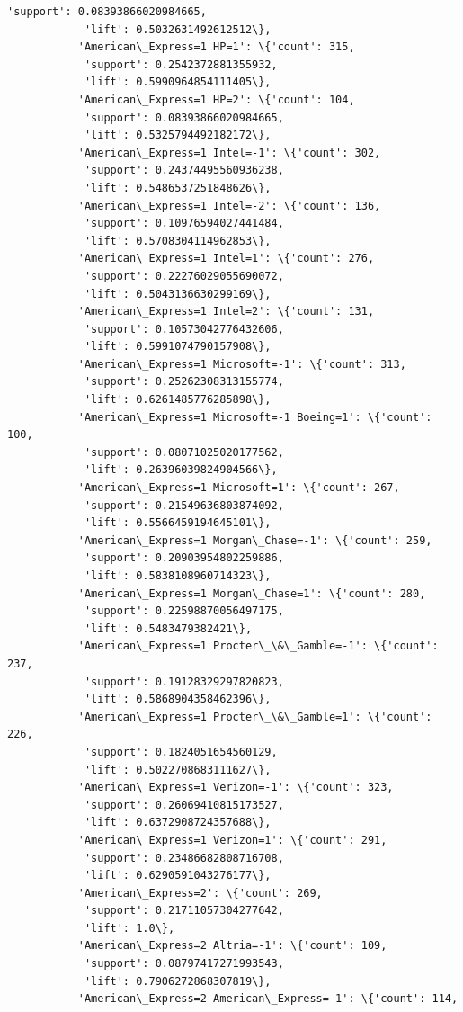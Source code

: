 \documentclass[11pt]{article}
\begin{document}
\begin{Verbatim}[commandchars=\\\{\}]
            'support': 0.08393866020984665,
            'lift': 0.5032631492612512\},
           'American\_Express=1 HP=1': \{'count': 315,
            'support': 0.2542372881355932,
            'lift': 0.5990964854111405\},
           'American\_Express=1 HP=2': \{'count': 104,
            'support': 0.08393866020984665,
            'lift': 0.5325794492182172\},
           'American\_Express=1 Intel=-1': \{'count': 302,
            'support': 0.24374495560936238,
            'lift': 0.5486537251848626\},
           'American\_Express=1 Intel=-2': \{'count': 136,
            'support': 0.10976594027441484,
            'lift': 0.5708304114962853\},
           'American\_Express=1 Intel=1': \{'count': 276,
            'support': 0.22276029055690072,
            'lift': 0.5043136630299169\},
           'American\_Express=1 Intel=2': \{'count': 131,
            'support': 0.10573042776432606,
            'lift': 0.5991074790157908\},
           'American\_Express=1 Microsoft=-1': \{'count': 313,
            'support': 0.25262308313155774,
            'lift': 0.6261485776285898\},
           'American\_Express=1 Microsoft=-1 Boeing=1': \{'count': 100,
            'support': 0.08071025020177562,
            'lift': 0.26396039824904566\},
           'American\_Express=1 Microsoft=1': \{'count': 267,
            'support': 0.21549636803874092,
            'lift': 0.5566459194645101\},
           'American\_Express=1 Morgan\_Chase=-1': \{'count': 259,
            'support': 0.20903954802259886,
            'lift': 0.5838108960714323\},
           'American\_Express=1 Morgan\_Chase=1': \{'count': 280,
            'support': 0.22598870056497175,
            'lift': 0.5483479382421\},
           'American\_Express=1 Procter\_\&\_Gamble=-1': \{'count': 237,
            'support': 0.19128329297820823,
            'lift': 0.5868904358462396\},
           'American\_Express=1 Procter\_\&\_Gamble=1': \{'count': 226,
            'support': 0.1824051654560129,
            'lift': 0.5022708683111627\},
           'American\_Express=1 Verizon=-1': \{'count': 323,
            'support': 0.26069410815173527,
            'lift': 0.6372908724357688\},
           'American\_Express=1 Verizon=1': \{'count': 291,
            'support': 0.23486682808716708,
            'lift': 0.6290591043276177\},
           'American\_Express=2': \{'count': 269,
            'support': 0.21711057304277642,
            'lift': 1.0\},
           'American\_Express=2 Altria=-1': \{'count': 109,
            'support': 0.08797417271993543,
            'lift': 0.7906272868307819\},
           'American\_Express=2 American\_Express=-1': \{'count': 114,

\end{Verbatim}
\end{document}
